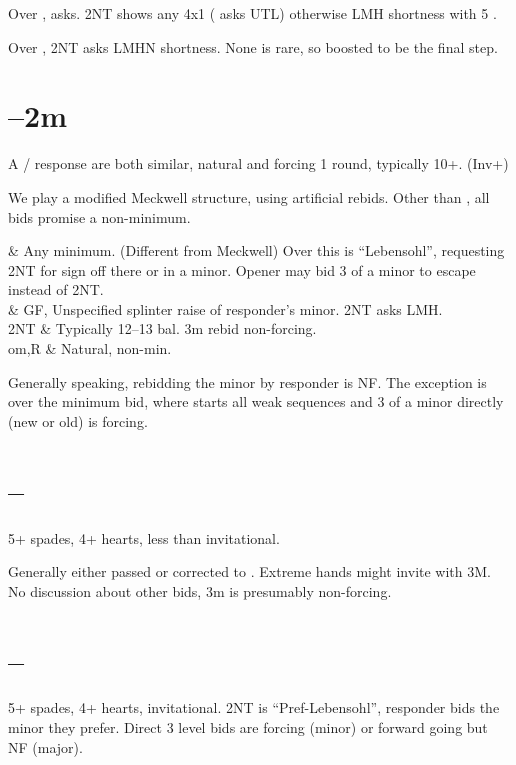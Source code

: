 \documentclass[tom-jenni]{subfiles}
\begin{document}
Over ,  asks. 2NT shows any 4x1 ( asks UTL) otherwise LMH shortness with 5 \ccc.

Over , 2NT asks LMHN shortness.  None is rare, so boosted to be the final step.  

\section[1D--2m]{--2m}

A / response are both similar, natural and forcing 1 round, typically 10+. (Inv+)

We play a modified Meckwell structure, using artificial rebids. Other than , all bids promise a non-minimum.

\begin{bidtable}{}
	 & Any minimum. (Different from Meckwell) Over this  is ``Lebensohl'', requesting 2NT for sign off there or in a minor. Opener may bid 3 of a minor to escape instead of 2NT. \\
	 & GF, Unspecified splinter raise of responder's minor. 2NT asks LMH. \\
	2NT & Typically 12--13 bal. 3m rebid non-forcing. \\
	om,R &  Natural, non-min. \\
\end{bidtable}

Generally speaking, rebidding the minor by responder is NF. The exception is over the  minimum bid, where  starts all weak sequences and 3 of a minor directly (new or old) is forcing.

\section[1D--2H]{--}

5+ spades, 4+ hearts, less than invitational. 

Generally either passed or corrected to . Extreme hands might invite with 3M. No discussion about other bids, 3m is presumably non-forcing.

\section[1D--2S]{--}

5+ spades, 4+ hearts, invitational.  2NT is ``Pref-Lebensohl'', responder bids the minor they prefer. Direct 3 level bids are forcing (minor) or forward going but NF (major).
\end{document}

